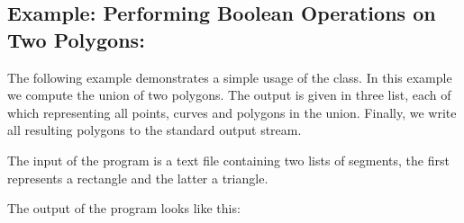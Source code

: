 \subsection*{Example: Performing Boolean Operations on Two Polygons:}
The following example demonstrates a simple usage of the 
 class.
In this example we compute the union of two polygons.
The output is given in three list, each of which
representing all points, curves and polygons in the union.
Finally, we write all resulting polygons to the standard output stream. 


The input of the program is a text file containing two lists of segments, 
the first represents a rectangle and the latter a triangle.

The output of the program looks like this:





